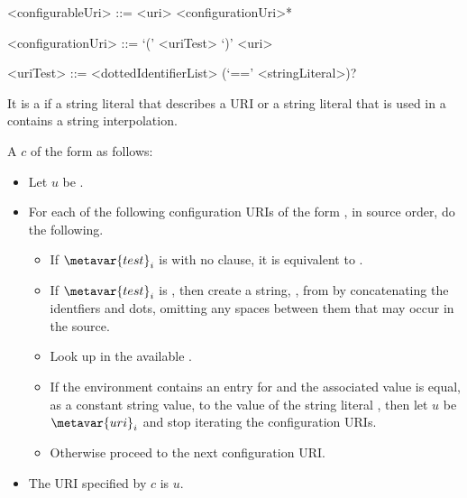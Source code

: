 \documentclass[makeidx]{article}
\begin{document}
{\begin{grammar}
<configurableUri> ::= <uri> <configurationUri>*

<configurationUri> ::= \IF{} `(' <uriTest> `)' <uri>

<uriTest> ::= <dottedIdentifierList> (`==' <stringLiteral>)?
\end{grammar}

\LMHash{}%
It is a  if a string literal that describes a URI
or a string literal that is used in a 
contains a string interpolation.

\LMHash{}%
A  $c$ of the form
 as follows:
\begin{itemize}
\item
  Let $u$ be .
\item
  For each of the following configuration URIs of the form
  ,
  in source order, do the following.
  \begin{itemize}
  \item
    If $\metavar{test}_i$ is 
    with no \lit{==} clause, it is
    equivalent to .
  \item
    If $\metavar{test}_i$ is ,
    then create a string, , from 
    by concatenating the identfiers and dots,
    omitting any spaces between them that may occur in the source.
  \item
    Look up  in the available
    .
  \item
    If the environment contains an entry for  and the
    associated value is equal, as a constant string value, to the value of
    the string literal ,
    then let $u$ be $\metavar{uri}_i$ and stop iterating the configuration URIs.
  \item
    Otherwise proceed to the next configuration URI.
  \end{itemize}
\item
  The URI specified by $c$ is $u$.
\end{itemize}

}
\end{document}
